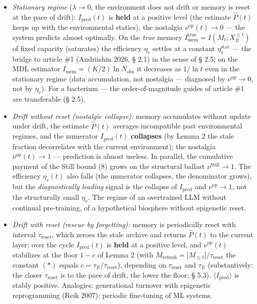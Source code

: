 \documentclass[pdflatex,sn-mathphys-ay]{sn-jnl}
\providecommand{\tightlist}{\setlength{\itemsep}{0pt}\setlength{\parskip}{0pt}}
\begin{document}
\begin{itemize}

\tightlist

\item

  \emph{Stationary regime} (\(\lambda \to 0\), the environment does not drift or memory is reset at the pace of drift): \(I_{\text{pred}}(t)\) is \textbf{held} at a positive level (the estimate \(\hat P(t)\) keeps up with the environmental statics), the nostalgia \(\nu^{\text{op}}(t) \to 0\) --- the system predicts almost optimally. On the \emph{true} memory \(I_{\text{mem}}^{\text{true}} = I(M_t; X_E^{\le t})\) of fixed capacity (saturates) the efficiency \(\eta_v\) settles at a constant \(\eta_v^{\text{stat}}\) --- the bridge to article \#1 (Andriishin 2026, § 2.1) in the sense of § 2.5; on the MDL estimator \(I_{\text{mem}} = (K/2)\ln N_{\text{obs}}\) it decreases as \(1/\ln t\) even in the stationary regime (data accumulation, not nostalgia --- diagnosed by \(\nu^{\text{op}} \to 0\), not by \(\eta_v\)). For a bacterium --- the order-of-magnitude guides of article \#1 are transferable (§ 2.5).

\item

  \emph{Drift without reset (nostalgic collapse):} memory accumulates without update under drift, the estimate \(\hat P(t)\) averages incompatible past environmental regimes, and the numerator \(I_{\text{pred}}(t)\) \textbf{collapses} (by Lemma 2 the stale fraction decorrelates with the current environment); the nostalgia \(\nu^{\text{op}}(t) \to 1\) --- prediction is almost useless. In parallel, the cumulative payment of the Still bound (8) grows on the structural ballast \(\nu^{\text{Still}} \to 1\). The efficiency \(\eta_v(t)\) also falls (the numerator collapses, the denominator grows), but the \emph{diagnostically leading} signal is the collapse of \(I_{\text{pred}}\) and \(\nu^{\text{op}} \to 1\), not the structurally small \(\eta_v\). The regime of an overtrained LLM without continual pre-training, of a hypothetical biosphere without epigenetic reset.

\item

  \emph{Drift with reset (rescue by forgetting):} memory is periodically reset with interval \(\tau_{\text{reset}}\), which zeroes the stale archive and returns \(\hat P(t)\) to the current layer; over the cycle \(I_{\text{pred}}(t)\) is \textbf{held} at a positive level, and \(\nu^{\text{op}}(t)\) stabilizes at the floor \(1-c\) of Lemma 2 (with \(\dot M_{\text{refresh}} = |M_{\le t}|/\tau_{\text{reset}}\) the constant \((*)\) equals \(c = \tau_E/\tau_{\text{reset}}\)), depending on \(\tau_{\text{reset}}\) and \(\tau_E\) (substantively: the closer \(\tau_{\text{reset}}\) is to the pace of drift, the lower the floor; § 5.3). \(\langle I_{\text{pred}}\rangle\) is stably positive. Analogies: generational turnover with epigenetic reprogramming (Reik 2007); periodic fine-tuning of ML systems.

\end{itemize}
\end{document}
